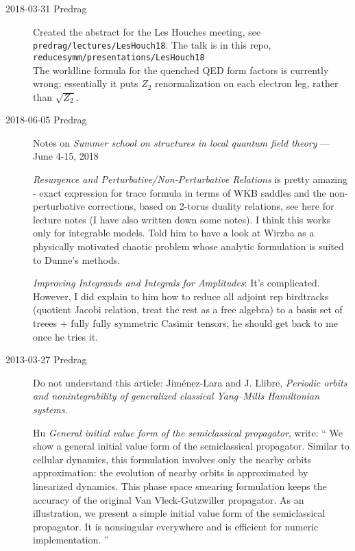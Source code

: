 \begin{description}
\item[2018-03-31 Predrag] Created the abstract for the Les Houches meeting, see\\
\texttt{predrag/lectures/LesHouch18}.
The talk is in this repo, \\
\texttt{reducesymm/presentations/LesHouch18} \\ %
The worldline formula for the quenched QED form factors is currently
wrong; essentially it puts $Z_2$ renormalization on each electron leg,
rather than $\sqrt{Z_2}$.

\item[2018-06-05 Predrag]
Notes on
{\em Summer school on structures in local quantum field theory}
 — June 4-15, 2018

{\em Resurgence and Perturbative/Non-Perturbative Relations} is pretty
amazing - exact expression for trace formula in terms of WKB saddles and
the non-perturbative corrections, based on 2-torus duality relations, see
{here} for lecture notes (I have also written down some notes). I think
this works only for integrable models. Told him to have a look at
Wirzba as a physically motivated chaotic problem whose
analytic formulation is suited to Dunne's methods.

{\em Improving Integrands and Integrals for Amplitudes}: It's
complicated. However, I did explain to him how to reduce all adjoint rep
birdtracks (quotient Jacobi relation, treat the rest as a free algebra)
to a basis set of treees + fully fully symmetric Casimir tensors; he
should get back to me once he tries it.

\item[2013-03-27  Predrag] Do not understand this article:
Jim\'enez-Lara and J. Llibre,
{\em Periodic orbits and nonintegrability of generalized
classical {Yang--Mills Hamiltonian} systems}.

Hu
{\em General initial value form of the semiclassical propagator},
write: ``
We show a general initial value form of the semiclassical propagator.
Similar to cellular dynamics, this formulation involves only the
nearby orbits approximation: the evolution of nearby orbits is
approximated by linearized dynamics. This phase space smearing
formulation keeps the accuracy of the original Van Vleck-Gutzwiller
propagator. As an illustration, we present a simple initial value
form of the semiclassical propagator. It is nonsingular everywhere
and is efficient for numeric implementation.
''


\end{description}

